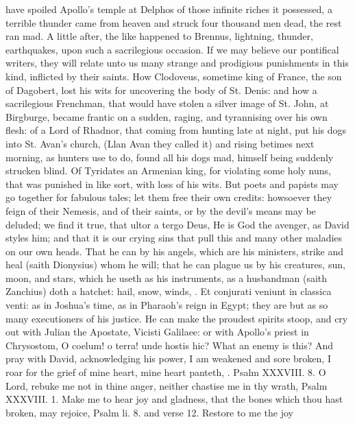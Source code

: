 {have spoiled Apollo's temple at Delphos of those infinite riches
it possessed, a terrible thunder came from heaven and struck four
thousand men dead, the rest ran mad. A little after, the like
happened to Brennus, lightning, thunder, earthquakes, upon such a
sacrilegious occasion. If we may believe our pontifical writers, they
will relate unto us many strange and prodigious punishments in this
kind, inflicted by their saints. How Clodoveus, sometime king of
France, the son of Dagobert, lost his wits for uncovering the body of
St. Denis: and how a sacrilegious Frenchman, that would have
stolen a silver image of St. John, at Birgburge, became frantic on a
sudden, raging, and tyrannising over his own flesh: of a Lord of
Rhadnor, that coming from hunting late at night, put his dogs into St.
Avan's church, (Llan Avan they called it) and rising betimes next
morning, as hunters use to do, found all his dogs mad, himself being
suddenly strucken blind. Of Tyridates an Armenian king, for
violating some holy nuns, that was punished in like sort, with loss of
his wits. But poets and papists may go together for fabulous tales; let
them free their own credits: howsoever they feign of their Nemesis, and
of their saints, or by the devil's means may be deluded; we find it
true, that ultor a tergo Deus, He is God the avenger, as David
styles him; and that it is our crying sins that pull this and many
other maladies on our own heads. That he can by his angels, which are
his ministers, strike and heal (saith Dionysius) whom he will;
that he can plague us by his creatures, sun, moon, and stars, which he
useth as his instruments, as a husbandman (saith Zanchius) doth a
hatchet: hail, snow, winds, \etc{}. Et conjurati veniunt in classica
venti: as in Joshua's time, as in Pharaoh's reign in Egypt; they are
but as so many executioners of his justice. He can make the proudest
spirits stoop, and cry out with Julian the Apostate, Vicisti Galilaee:
or with Apollo's priest in Chrysostom, O coelum! o terra! unde
hostis hic? What an enemy is this? And pray with David, acknowledging
his power, I am weakened and sore broken, I roar for the grief of mine
heart, mine heart panteth, \etc{}. Psalm XXXVIII. 8. O Lord, rebuke me not
in thine anger, neither chastise me in thy wrath, Psalm XXXVIII. 1.
Make me to hear joy and gladness, that the bones which thou hast
broken, may rejoice, Psalm li. 8. and verse 12. Restore to me the joy
}
